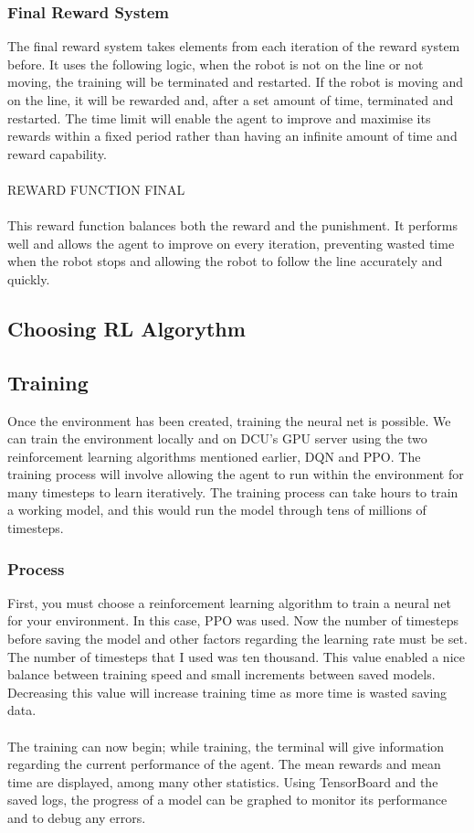 \documentclass[a4paper,11pt]{article}
\begin{document}
\subsubsection{Final Reward System} 

The final reward system takes elements from each iteration of the reward system before. It uses the following logic, when the robot is not on the line or not moving, the training will be terminated and restarted. If the robot is moving and on the line, it will be rewarded and, after a set amount of time, terminated and restarted. The time limit will enable the agent to improve and maximise its rewards within a fixed period rather than having an infinite amount of time and reward capability.
\\\\
REWARD FUNCTION FINAL
\\\\
This reward function balances both the reward and the punishment. It performs well and allows the agent to improve on every iteration, preventing wasted time when the robot stops and allowing the robot to follow the line accurately and quickly.

\subsection{Choosing RL Algorythm}

\subsection{Training}
Once the environment has been created, training the neural net is possible. We can train the environment locally and on DCU's GPU server using the two reinforcement learning algorithms mentioned earlier, DQN and PPO. The training process will involve allowing the agent to run within the environment for many timesteps to learn iteratively. The training process can take hours to train a working model, and this would run the model through tens of millions of timesteps. 

\subsubsection{Process}

First, you must choose a reinforcement learning algorithm to train a neural net for your environment. In this case, PPO was used. Now the number of timesteps before saving the model and other factors regarding the learning rate must be set. The number of timesteps that I used was ten thousand. This value enabled a nice balance between training speed and small increments between saved models. Decreasing this value will increase training time as more time is wasted saving data. 
\\\\
The training can now begin; while training, the terminal will give information regarding the current performance of the agent. The mean rewards and mean time are displayed, among many other statistics. Using TensorBoard and the saved logs, the progress of a model can be graphed to monitor its performance and to debug any errors.
\end{document}
